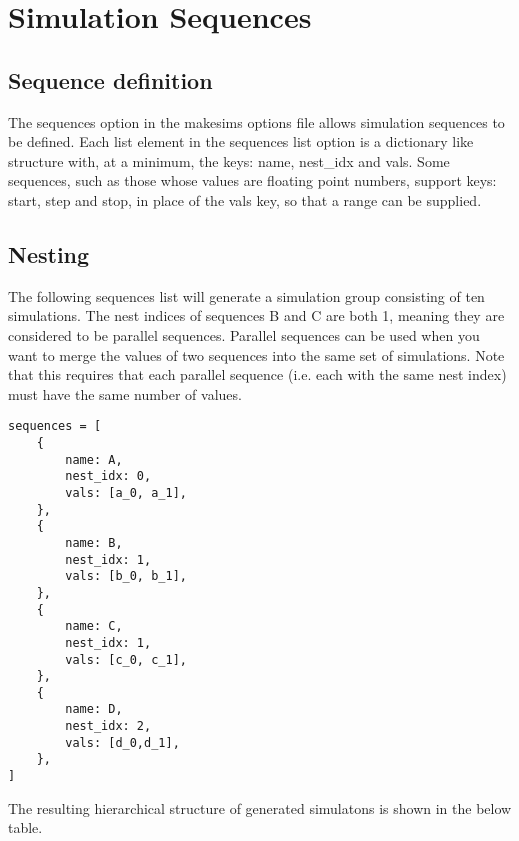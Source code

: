 \documentclass[12pt]{article}
\begin{document}
\section{Simulation Sequences}

\subsection{Sequence definition}
The sequences option in the makesims options file allows simulation sequences to be defined. Each list element in the sequences list option is a dictionary like structure with, at a minimum, the keys: name, nest\_idx and vals. Some sequences, such as those whose values are floating point numbers, support keys: start, step and stop, in place of the vals key, so that a range can be supplied.

\subsection{Nesting}
The following sequences list will generate a simulation group consisting of ten simulations. The nest indices of sequences B and C are both 1, meaning they are considered to be parallel sequences. Parallel sequences can be used when you want to merge the values of two sequences into the same set of simulations. Note that this requires that each parallel sequence (i.e. each with the same nest index) must have the same number of values.

\lstset{
    language=python,
    numbers=left,
    frame=single,
    basicstyle=\ttfamily\footnotesize,
    caption=Sequences list to generate a simulation group of nine simulations.}

\begin{lstlisting}
sequences = [
    {
        name: A,
        nest_idx: 0,
        vals: [a_0, a_1],
    },
    {
        name: B,
        nest_idx: 1,
        vals: [b_0, b_1],
    },
    {
        name: C,
        nest_idx: 1,
        vals: [c_0, c_1],
    },    
    {
        name: D,
        nest_idx: 2,
        vals: [d_0,d_1],
    },    
]
\end{lstlisting}

The resulting hierarchical structure of generated simulatons is shown in the below table.
\end{document}
